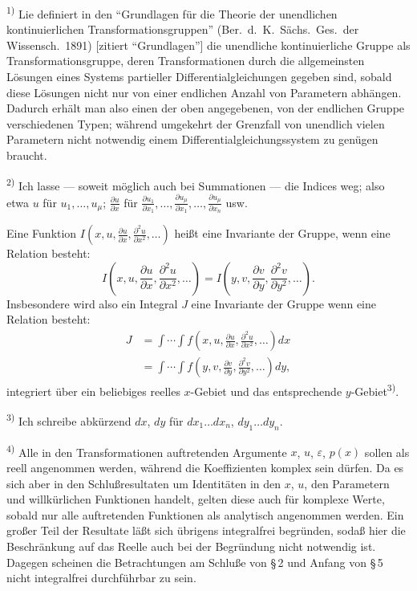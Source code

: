 \documentclass[12pt,a4paper]{article}
\begin{document}
\smallskip
\noindent\textsuperscript{1)} Lie definiert in den ``Grundlagen f\"ur die Theorie der unendlichen kontinuierlichen Transformationsgruppen'' (Ber.\ d.\ K.\ S\"achs.\ Ges.\ der Wissensch.\ 1891) [zitiert ``Grundlagen''] die unendliche kontinuierliche Gruppe als Transformationsgruppe, deren Transformationen durch die allgemeinsten L\"osungen eines Systems partieller Differentialgleichungen gegeben sind, sobald diese L\"osungen nicht nur von einer endlichen Anzahl von Parametern abh\"angen. Dadurch erh\"alt man also einen der oben angegebenen, von der endlichen Gruppe verschiedenen Typen; w\"ahrend umgekehrt der Grenzfall von unendlich vielen Parametern nicht notwendig einem Differentialgleichungssystem zu gen\"ugen braucht.

\smallskip
\noindent\textsuperscript{2)} Ich lasse --- soweit m\"oglich auch bei Summationen --- die Indices weg; also etwa $u$ f\"ur $u_{1},\ldots,u_{\mu}$; $\frac{\partial u}{\partial x}$ f\"ur $\frac{\partial u_{1}}{\partial x_{1}},\ldots,\frac{\partial u_{\mu}}{\partial x_{1}},\ldots,\frac{\partial u_{\mu}}{\partial x_{n}}$ usw.

Eine Funktion $I\left(x,u,\frac{\partial u}{\partial x},\frac{\partial^{2}u}{\partial x^{2}},\ldots\right)$ hei\ss{}t eine Invariante der Gruppe, wenn eine Relation besteht:
\[
I\left(x,u,\frac{\partial u}{\partial x},\frac{\partial^{2}u}{\partial x^{2}},\ldots\right)
=I\left(y,v,\frac{\partial v}{\partial y},\frac{\partial^{2}v}{\partial y^{2}},\ldots\right).
\]
Insbesondere wird also ein Integral $J$ eine Invariante der Gruppe wenn eine Relation besteht:
\begin{equation}\tag{1}
\begin{aligned}
J&=\int\cdots\int f\left(x,u,\frac{\partial u}{\partial x},\frac{\partial^{2}u}{\partial x^{2}},\ldots\right)dx\\
&=\int\cdots\int f\left(y,v,\frac{\partial v}{\partial y},\frac{\partial^{2}v}{\partial y^{2}},\ldots\right)dy,
\end{aligned}
\end{equation}
integriert \"uber ein beliebiges reelles $x$-Gebiet und das entsprechende $y$-Gebiet\textsuperscript{3)}.

\smallskip
\noindent\textsuperscript{3)} Ich schreibe abk\"urzend $dx$, $dy$ f\"ur $dx_{1}\ldots dx_{n}$, $dy_{1}\ldots dy_{n}$.

\smallskip
\noindent\textsuperscript{4)} Alle in den Transformationen auftretenden Argumente $x$, $u$, $\varepsilon$, $p(x)$ sollen als reell angenommen werden, w\"ahrend die Koeffizienten komplex sein d\"urfen. Da es sich aber in den Schlu\ss{}resultaten um Identit\"aten in den $x$, $u$, den Parametern und willk\"urlichen Funktionen handelt, gelten diese auch f\"ur komplexe Werte, sobald nur alle auftretenden Funktionen als analytisch angenommen werden. Ein gro\ss{}er Teil der Resultate l\"a\ss{}t sich \"ubrigens integralfrei begr\"unden, soda\ss{} hier die Beschr\"ankung auf das Reelle auch bei der Begr\"undung nicht notwendig ist. Dagegen scheinen die Betrachtungen am Schlu\ss{}e von \S\,2 und Anfang von \S\,5 nicht integralfrei durchf\"uhrbar zu sein.
\end{document}

